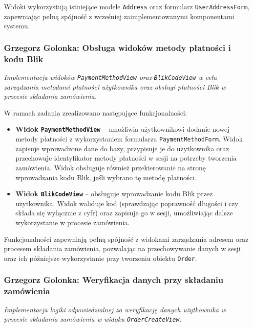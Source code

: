 \documentclass[12pt,a4paper,oneside]{article}
\theoremstyle{definition}
\numberwithin{equation}{section}
\begin{document}
Widoki wykorzystują istniejące modele \texttt{Address} oraz formularz \texttt{UserAddressForm}, zapewniając pełną spójność z wcześniej zaimplementowanymi komponentami systemu.

% 
% 
\subsubsection{Grzegorz Golonka: Obsługa widoków metody płatności i kodu Blik}
\label{section:1.3.23}
\textit{
Implementacja widoków \texttt{PaymentMethodView} oraz \texttt{BlikCodeView} w celu zarządzania metodami płatności użytkownika oraz obsługi płatności Blik w procesie składania zamówienia.
}

W ramach zadania zrealizowano następujące funkcjonalności:
\begin{itemize}
    \item \textbf{Widok \texttt{PaymentMethodView}} – umożliwia użytkownikowi dodanie nowej metody płatności z wykorzystaniem formularza \texttt{PaymentMethodForm}. Widok zapisuje wprowadzone dane do bazy, przypisuje je do użytkownika oraz przechowuje identyfikator metody płatności w sesji na potrzeby tworzenia zamówienia. Widok obsługuje również przekierowanie na stronę wprowadzania kodu Blik, jeśli wybrano tę metodę płatności.
    \item \textbf{Widok \texttt{BlikCodeView}} – obsługuje wprowadzanie kodu Blik przez użytkownika. Widok waliduje kod (sprawdzając poprawność długości i czy składa się wyłącznie z cyfr) oraz zapisuje go w sesji, umożliwiając dalsze wykorzystanie w procesie zamówienia.
\end{itemize}

Funkcjonalności zapewniają pełną spójność z widokami zarządzania adresem oraz procesem składania zamówienia, pozwalając na przechowywanie danych w sesji oraz ich późniejsze wykorzystanie przy tworzeniu obiektu \texttt{Order}.

% 
% 
\subsubsection{Grzegorz Golonka: Weryfikacja danych przy składaniu zamówienia}
\label{section:1.3.24}
\textit{
Implementacja logiki odpowiedzialnej za weryfikację danych użytkownika w procesie składania zamówienia w widoku \texttt{OrderCreateView}.
}
\end{document}
